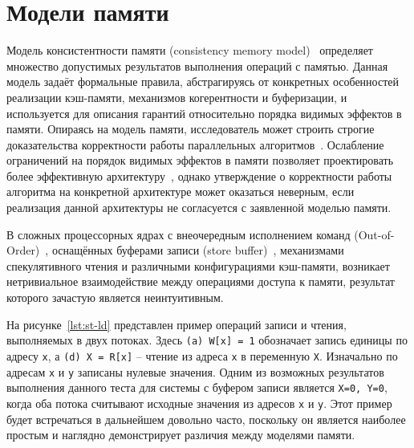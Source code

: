 \section{Модели памяти}
\label{sec:ch1/memory_model}

Модель консистентности памяти (consistency memory
model)~\cite{memory-model} определяет множество допустимых
результатов выполнения операций с памятью. Данная модель задаёт
формальные правила, абстрагируясь от конкретных особенностей
реализации кэш-памяти, механизмов когерентности и буферизации, и
используется для описания гарантий относительно порядка видимых
эффектов в памяти. Опираясь на модель памяти, исследователь может
строить строгие доказательства корректности работы параллельных
алгоритмов~\cite{escobar2024formal,leino2009basis,esparza2011complexity}.
Ослабление ограничений на порядок видимых эффектов в памяти позволяет
проектировать более эффективную
архитектуру~\cite{ritson2016benchmarking}, однако утверждение о
корректности работы алгоритма на конкретной архитектуре может
оказаться неверным, если реализация данной архитектуры не согласуется
с заявленной моделью памяти.

В сложных процессорных ядрах с внеочередным исполнением команд
(Out-of-Order)~\cite{ooo-cpu}, оснащённых буферами записи (store
buffer)~\cite{store-buffer}, механизмами спекулятивного чтения и
различными конфигурациями кэш-памяти, возникает нетривиальное
взаимодействие между операциями доступа к памяти, результат которого
зачастую является неинтуитивным.

На рисунке~\ref{lst:st-ld} представлен пример операций записи и
чтения, выполняемых в двух потоках. Здесь \texttt{(a) W[x] = 1}
обозначает запись единицы по адресу \texttt{x}, а \texttt{(d) X =
R[x]} -- чтение из адреса \texttt{x} в переменную \texttt{X}.
Изначально по адресам \texttt{x} и \texttt{y} записаны нулевые
значения. Одним из возможных результатов выполнения данного теста для
системы с буфером записи является \texttt{X=0,~Y=0}, когда оба потока
считывают исходные значения из адресов \texttt{x} и \texttt{y}. Этот
пример будет встречаться в дальнейшем довольно часто, поскольку он
является наиболее простым и наглядно демонстрирует различия между
моделями памяти.

